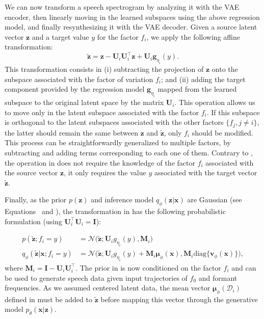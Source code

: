 \documentclass[review]{elsarticle}
\newcommand{\diag}{\text{diag}}
\begin{document}
We can now transform a speech spectrogram by analyzing it with the VAE encoder, then linearly moving in the learned subspaces using the above regression model, and finally resynthesizing it with the VAE decoder.
Given a source latent vector $\mathbf{z}$ and a target value $y$ for the factor $f_i$, we apply the following affine transformation:
\begin{equation}
    \tilde{\mathbf{z}} = \mathbf{z} - \mathbf{U}_i \mathbf{U}_i^\top \mathbf{z} + \mathbf{U}_i \mathbf{g}_{\eta_i}(y).
    \label{z_tilde}
\end{equation}
This transformation consists in (i) subtracting the projection of $\mathbf{z}$ onto the subspace associated with the factor of variation $f_i$; and (ii) adding the target component provided by the regression model $\mathbf{g}_{\eta_i}$ mapped from the learned subspace to the original latent space by the matrix $\mathbf{U}_i$. This operation allows us to move only in the latent subspace associated with the factor $f_i$. If this subspace is orthogonal to the latent subspaces associated with the other factors $\{f_j, j \neq i\}$, the latter should remain the same between $\mathbf{z}$ and $\tilde{\mathbf{z}}$, only $f_i$ should be modified. This process can be straightforwardly generalized to multiple factors, by subtracting and adding terms corresponding to each one of them. Contrary to \citet{hsu2017learning}, the operation in  does not require the knowledge of the factor $f_i$ associated with the source vector $\mathbf{z}$, it only requires the value $y$ associated with the target vector $\tilde{\mathbf{z}}$.

Finally, as the prior $p(\mathbf{z})$ and inference model $q_\phi(\mathbf{z} | \mathbf{x})$ are Gaussian (see Equations~ and ), the transformation in  has the following probabilistic formulation (using $\mathbf{U}_i^\top\mathbf{U}_i = \mathbf{I}$):

\begin{align}
    p(\tilde{\mathbf{z}} ; f_i = y) &= \mathcal{N}\Big(\tilde{\mathbf{z}}; \mathbf{U}_i g_{\eta_i}(y), \mathbf{M}_i \Big) \label{conditional_prior} \\
    q_\phi(\tilde{\mathbf{z}} | \mathbf{x} ; f_i = y) &= \mathcal{N}\Big(\tilde{\mathbf{z}}; \mathbf{U}_i g_{\eta_i}(y) + \mathbf{M}_i\boldsymbol{\mu}_{\phi}(\mathbf{x}), \mathbf{M}_i \diag\{\mathbf{v}_{\phi}(\mathbf{x})\} \Big),
    \label{eq:q-z-tilde}
\end{align}
where $\mathbf{M}_i = \mathbf{I} - \mathbf{U}_i\mathbf{U}_i^\top$. The prior in  is now conditioned on the factor $f_i$ and can be used to generate speech data given input trajectories of $f_0$ and formant frequencies. As we assumed centered latent data, the mean vector $\boldsymbol{\mu}_\phi(\mathcal{D}_i)$ defined in  must be added to $\tilde{\mathbf{z}}$ before mapping this vector through the generative model $p_\theta(\mathbf{x} | \mathbf{z})$.
\end{document}
